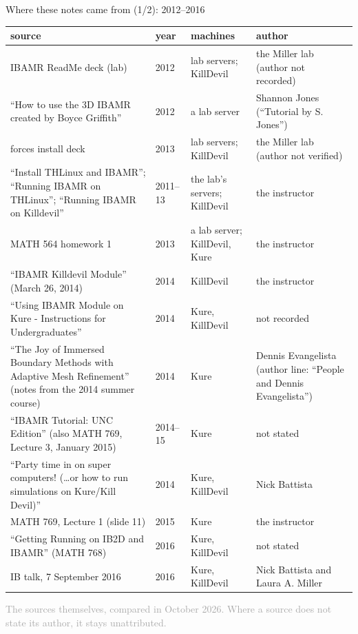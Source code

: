 \documentclass[aspectratio=169,11pt]{beamer}
\newcommand{\sourcecredit}[1]{\vfill\begin{flushright}\tiny\textcolor{DarkGray}{#1}\end{flushright}}
\begin{document}
\begin{frame}{Where these notes came from (1/2): 2012--2016}
\label{fr:sources1}
\tiny
\renewcommand{\arraystretch}{1.12}
\setlength{\tabcolsep}{3pt}
\begin{tabular}{@{}L{0.42\textwidth}L{0.08\textwidth}L{0.2\textwidth}L{0.25\textwidth}@{}}
\toprule
source & year & machines & author \\
\midrule
IBAMR ReadMe deck (lab) & 2012 & lab servers; KillDevil & the Miller lab (author not recorded) \\
``How to use the 3D IBAMR created by Boyce Griffith'' & 2012 & a lab server & Shannon Jones (``Tutorial by S. Jones'') \\
forces install deck & 2013 & lab servers; KillDevil & the Miller lab (author not verified) \\
``Install THLinux and IBAMR''; ``Running IBAMR on THLinux''; ``Running IBAMR on Killdevil'' & 2011--13 & the lab's servers; KillDevil & the instructor \\
MATH 564 homework 1 & 2013 & a lab server; KillDevil, Kure & the instructor \\
``IBAMR Killdevil Module'' (March 26, 2014) & 2014 & KillDevil & the instructor \\
``Using IBAMR Module on Kure - Instructions for Undergraduates'' & 2014 & Kure, KillDevil & not recorded \\
``The Joy of Immersed Boundary Methods with Adaptive Mesh Refinement'' (notes from the 2014 summer course) & 2014 & Kure & Dennis Evangelista (author line: ``People and Dennis Evangelista'') \\
``IBAMR Tutorial: UNC Edition'' (also MATH 769, Lecture 3, January 2015) & 2014--15 & Kure & not stated \\
``Party time in on super computers! (\ldots or how to run simulations on Kure/Kill Devil)'' & 2014 & Kure, KillDevil & Nick Battista \\
MATH 769, Lecture 1 (slide 11) & 2015 & Kure & the instructor \\
``Getting Running on IB2D and IBAMR'' (MATH 768) & 2016 & Kure, KillDevil & not stated \\
IB talk, 7 September 2016 & 2016 & Kure, KillDevil & Nick Battista and Laura A. Miller \\
\bottomrule
\end{tabular}
\sourcecredit{The sources themselves, compared in October 2026. Where a source does not state its author, it stays unattributed.}
\end{frame}
\end{document}
